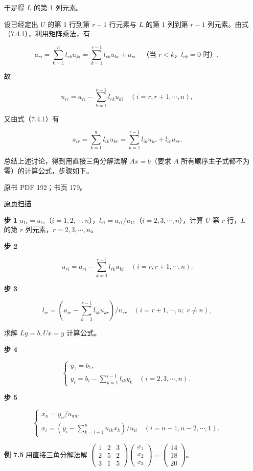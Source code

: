\documentclass[
  10pt,
  fontset=fandol]{ctexart}
\begin{document}
于是得 \(L\) 的第 1 列元素。

设已经定出 \(U\) 的第 1 行到第 \(r-1\) 行元素与 \(L\) 的第 1 列到第 \(r-1\) 列元素。由式（7.4.1），利用矩阵乘法，有

\[a_{ri}=\sum_{k=1}^{n}l_{rk}u_{ki}=\sum_{k=1}^{r-1}l_{rk}u_{ki}+u_{ri}\quad\text{（当 $r<k$，$l_{rk}=0$ 时）},\]

故

\[u_{ri}=a_{ri}-\sum_{k=1}^{r-1}l_{rk}u_{ki}\quad(i=r,r+1,\cdots,n),\]

又由式（7.4.1）有

\[a_{ir}=\sum_{k=1}^{n}l_{ik}u_{kr}=\sum_{k=1}^{r-1}l_{ik}u_{kr}+l_{ir}u_{rr}.\]

总结上述讨论，得到用直接三角分解法解 \(Ax=b\)（要求 \(A\) 所有顺序主子式都不为零）的计算公式，步骤如下。

\clearpage

原书 PDF 192；书页 179。

\href{../../../source-images/pdf-192.jpeg}{原页扫描}

\textbf{步 1} \(u_{1i}=a_{1i}\)（\(i=1,2,\cdots,n\)），\(l_{i1}=a_{i1}/u_{11}\)（\(i=2,3,\cdots,n\)），计算 \(U\) 第 \(r\) 行，\(L\) 的第 \(r\) 列元素，\(r=2,3,\cdots,n\)。

\textbf{步 2}

\[u_{ri}=a_{ri}-\sum_{k=1}^{r-1}l_{rk}u_{ki}\quad(i=r,r+1,\cdots,n).\tag{7.4.2}\]

\textbf{步 3}

\[l_{ir}=\left(a_{ir}-\sum_{k=1}^{r-1}l_{ik}u_{kr}\right)/u_{rr}\quad(i=r+1,\cdots,n;\;r\ne n),\tag{7.4.3}\]

求解 \(Ly=b,Ux=y\) 计算公式。

\textbf{步 4}

\[
\begin{cases}
y_1=b_1,\\
y_i=\displaystyle b_i-\sum_{k=1}^{i-1}l_{ik}y_k\quad(i=2,3,\cdots,n).
\end{cases}
\tag{7.4.4}
\]

\textbf{步 5}

\[
\begin{cases}
x_n=y_n/u_{nn},\\
x_i=\displaystyle\left(y_i-\sum_{k=i+1}^{n}u_{ik}x_k\right)/u_{ii}\quad(i=n-1,n-2,\cdots,1).
\end{cases}
\tag{7.4.5}
\]

\textbf{例 7.5} 用直接三角分解法解 \(\begin{pmatrix}1&2&3\\2&5&2\\3&1&5\end{pmatrix}\begin{pmatrix}x_1\\x_2\\x_3\end{pmatrix}=\begin{pmatrix}14\\18\\20\end{pmatrix}\)。
\end{document}
